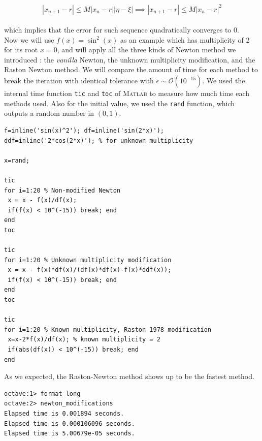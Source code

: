 \documentclass[paper=a4, fontsize=11pt]{scrartcl}
\newcommand{\MATLAB}{\textsc{Matlab}\xspace}
\begin{document}
\begin{equation}\nonumber
	| x_{n+1}-r | \leq M |x_n - r| |\eta - \xi|  \implies | x_{n+1}-r | \leq M |x_n - r|^2
\end{equation}\\

which implies that the error for such sequence quadratically converges to 0.\\

 Now we will use $f(x)=\sin^2(x)$ as an example which has multiplicity of 2 for its root $x=0$, and will apply all the three kinds of Newton method we introduced : the \textit{vanilla} Newton, the unknown multiplicity modification, and the Raston Newton method. We will compare the amount of time for each method to break the iteration with identical tolerance with $\epsilon\sim \mathcal{O}(10^{-15})$. We used the internal time function \texttt{tic} and \texttt{toc} of \MATLAB to measure how much time each methods used. Also for the initial value, we used the \texttt{rand} function, which outputs a random number in $(0,1)$. \\

\begin{lstlisting}[caption='newton\_modifications.m']
f=inline('sin(x)^2'); df=inline('sin(2*x)'); 
ddf=inline('2*cos(2*x)'); % for unknown multiplicity

x=rand;

tic 
for i=1:20 % Non-modified Newton
 x = x - f(x)/df(x);
 if(f(x) < 10^(-15)) break; end
end 
toc

tic 
for i=1:20 % Unknown multiplicity modification
 x = x - f(x)*df(x)/(df(x)*df(x)-f(x)*ddf(x));
 if(f(x) < 10^(-15)) break; end
end 
toc

tic 
for i=1:20 % Known multiplicity, Raston 1978 modification
 x=x-2*f(x)/df(x); % known multiplicity = 2  
 if(abs(df(x)) < 10^(-15)) break; end 
end 

\end{lstlisting}
\vspace{0.15in}

As we expected, the Raston-Newton method shows up to be the fastest method.

\begin{verbatim}
octave:1> format long
octave:2> newton_modifications
Elapsed time is 0.001894 seconds.
Elapsed time is 0.000106096 seconds.
Elapsed time is 5.00679e-05 seconds.
\end{verbatim}

\vspace{0.15in}
\end{document}
